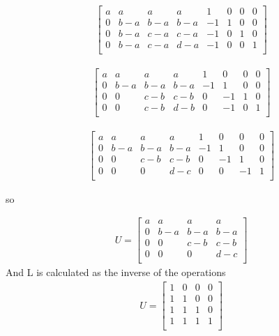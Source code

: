 \documentclass[a4paper,11pt]{article}
\begin{document}
\begin{align}
\left[
\begin{array}{cccc|cccc}
a & a   & a   & a   & 1   & 0 & 0 & 0 \\
0 & b-a & b-a & b-a & -1  & 1 & 0 & 0\\
0 & b-a & c-a & c-a & -1  & 0 & 1 & 0\\
0 & b-a & c-a & d-a & -1  & 0 & 0 & 1\\
\end{array}
\right]
\end{align}

\begin{align}
\left[
\begin{array}{cccc|cccc}
a & a   & a   & a   & 1  & 0  & 0 & 0 \\
0 & b-a & b-a & b-a & -1 & 1  & 0 & 0\\
0 & 0   & c-b & c-b & 0  & -1 & 1 & 0\\
0 & 0   & c-b & d-b & 0  & -1 & 0 & 1\\
\end{array}
\right]
\end{align}

\begin{align}
\left[
\begin{array}{cccc|cccc}
a & a   & a   & a   & 1  & 0  & 0  & 0 \\
0 & b-a & b-a & b-a & -1 & 1  & 0  & 0\\
0 & 0   & c-b & c-b & 0  & -1 & 1  & 0\\
0 & 0   & 0   & d-c & 0  & 0  & -1 & 1\\
\end{array}
\right]
\end{align}

so 

\begin{align}
U = 
\begin{bmatrix}
a & a   & a   & a   \\
0 & b-a & b-a & b-a \\
0 & 0   & c-b & c-b \\
0 & 0   & 0   & d-c \\
\end{bmatrix}
\end{align}
And L is calculated as the inverse of the operations
\begin{align}
U = 
\begin{bmatrix}
1 & 0 & 0 & 0 \\
1 & 1 & 0 & 0 \\
1 & 1 & 1 & 0 \\
1 & 1 & 1 & 1 \\
\end{bmatrix}
\end{align}
\end{document}
